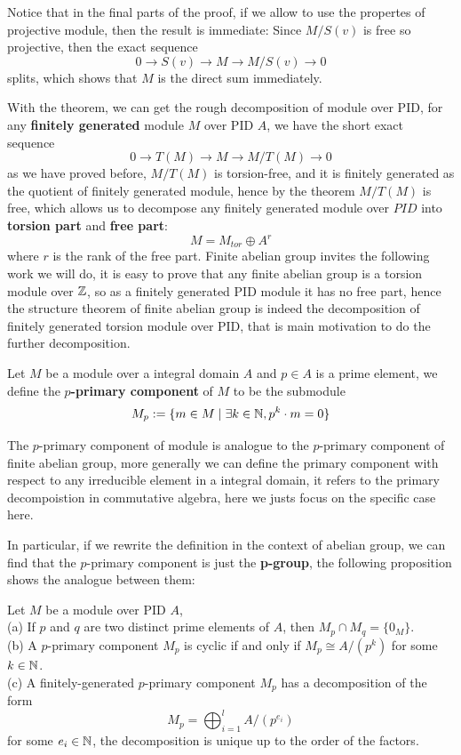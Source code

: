 \documentclass[12pt,a4paper]{article}
\begin{document}
\begin{remark}
   Notice that in the final parts of the proof, if we allow to use the propertes of projective module, then the result is immediate: Since \(M/S(v)\) is free so projective, then the exact sequence
   \[0 \to S(v) \to M \to M/S(v) \to 0\]
   splits, which shows that \(M\) is the direct sum immediately. 
\end{remark}

With the theorem, we can get the rough decomposition of module over PID, for any \textbf{finitely generated} module \(M\) over PID \(A\), we have the short exact sequence
\[0 \to T(M) \to M \to M/T(M) \to 0\]
as we have proved before, \(M/T(M)\) is torsion-free, and it is finitely generated as the quotient of finitely generated module, hence by the theorem \(M/T(M)\) is free, which allows us to decompose any finitely generated module over \(PID\) into \textbf{torsion part} and \textbf{free part}:
\[M = M_{tor} \oplus A^r\]
where \(r\) is the rank of the free part. Finite abelian group invites the following work we will do, it is easy to prove that any finite abelian group is a torsion module over \(\mathbb{Z}\), so as a finitely generated PID module it has no free part, hence the structure theorem of finite abelian group is indeed the decomposition of finitely generated torsion module over PID, that is main motivation to do the further decomposition.

\begin{definition}
    Let \(M\) be a module over a integral domain \(A\) and \(p \in A\) is a prime element, we define the \textbf{\(p\)-primary component} of \(M\) to be the submodule
    \[M_p : = \{m \in M \mid \exists k \in \mathbb{N}, p^k\cdot m = 0\}\]
\end{definition}
The \(p\)-primary component of module is analogue to the \(p\)-primary component of finite abelian group, more generally we can define the primary component with respect to any irreducible element in a integral domain, it refers to the primary decompoistion in commutative algebra, here we justs focus on the specific case here.

In particular, if we rewrite the definition in the context of abelian group, we can find that the \(p\)-primary component is just the \textbf{p-group}, the following proposition shows the analogue between them:

\begin{propositionplain}
    Let \(M\) be a module over PID \(A\),\\

    (a) If \(p\) and \(q\) are two distinct prime elements of \(A\), then \(M_p \cap M_q = \{0_M\}\).\\

    (b) A \(p\)-primary component \(M_p\) is cyclic if and only if \(M_p \cong A/(p^k)\) for some \(k \in \mathbb{N}\).\\

    (c) A finitely-generated \(p\)-primary component \(M_p\) has a decomposition of the form
    \[M_p = \bigoplus_{i=1}^l A/(p^{e_i})\]
    for some \(e_i \in \mathbb{N}\), the decomposition is unique up to the order of the factors.
\end{propositionplain}
\end{document}
